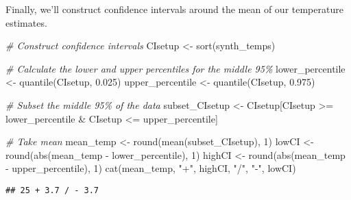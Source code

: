 \documentclass[
]{article}
\newenvironment{Shaded}{\begin{snugshade}}{\end{snugshade}}
\newcommand{\CommentTok}[1]{\textcolor[rgb]{0.56,0.35,0.01}{\textit{#1}}}
\newcommand{\DecValTok}[1]{\textcolor[rgb]{0.00,0.00,0.81}{#1}}
\newcommand{\FloatTok}[1]{\textcolor[rgb]{0.00,0.00,0.81}{#1}}
\newcommand{\FunctionTok}[1]{\textcolor[rgb]{0.00,0.00,0.00}{#1}}
\newcommand{\NormalTok}[1]{#1}
\newcommand{\OtherTok}[1]{\textcolor[rgb]{0.56,0.35,0.01}{#1}}
\newcommand{\SpecialCharTok}[1]{\textcolor[rgb]{0.00,0.00,0.00}{#1}}
\newcommand{\StringTok}[1]{\textcolor[rgb]{0.31,0.60,0.02}{#1}}
\begin{document}
Finally, we'll construct confidence intervals around the mean of our
temperature estimates.

\begin{Shaded}
\begin{Highlighting}[]
\CommentTok{\# Construct confidence intervals}
\NormalTok{    CIsetup }\OtherTok{\textless{}{-}} \FunctionTok{sort}\NormalTok{(synth\_temps)}
    
\CommentTok{\# Calculate the lower and upper percentiles for the middle 95\%}
\NormalTok{    lower\_percentile }\OtherTok{\textless{}{-}} \FunctionTok{quantile}\NormalTok{(CIsetup, }\FloatTok{0.025}\NormalTok{)}
\NormalTok{    upper\_percentile }\OtherTok{\textless{}{-}} \FunctionTok{quantile}\NormalTok{(CIsetup, }\FloatTok{0.975}\NormalTok{)}
    
\CommentTok{\# Subset the middle 95\% of the data}
\NormalTok{    subset\_CIsetup }\OtherTok{\textless{}{-}}\NormalTok{ CIsetup[CIsetup }\SpecialCharTok{\textgreater{}=}\NormalTok{ lower\_percentile }\SpecialCharTok{\&}\NormalTok{ CIsetup }\SpecialCharTok{\textless{}=}\NormalTok{ upper\_percentile]}
    
\CommentTok{\# Take mean}
\NormalTok{    mean\_temp }\OtherTok{\textless{}{-}} \FunctionTok{round}\NormalTok{(}\FunctionTok{mean}\NormalTok{(subset\_CIsetup), }\DecValTok{1}\NormalTok{)}
\NormalTok{    lowCI }\OtherTok{\textless{}{-}} \FunctionTok{round}\NormalTok{(}\FunctionTok{abs}\NormalTok{(mean\_temp }\SpecialCharTok{{-}}\NormalTok{ lower\_percentile), }\DecValTok{1}\NormalTok{)}
\NormalTok{    highCI }\OtherTok{\textless{}{-}} \FunctionTok{round}\NormalTok{(}\FunctionTok{abs}\NormalTok{(mean\_temp }\SpecialCharTok{{-}}\NormalTok{ upper\_percentile), }\DecValTok{1}\NormalTok{)}
    \FunctionTok{cat}\NormalTok{(mean\_temp, }\StringTok{"+"}\NormalTok{, highCI, }\StringTok{"/"}\NormalTok{, }\StringTok{"{-}"}\NormalTok{, lowCI)}
\end{Highlighting}
\end{Shaded}

\begin{verbatim}
## 25 + 3.7 / - 3.7
\end{verbatim}
\end{document}
